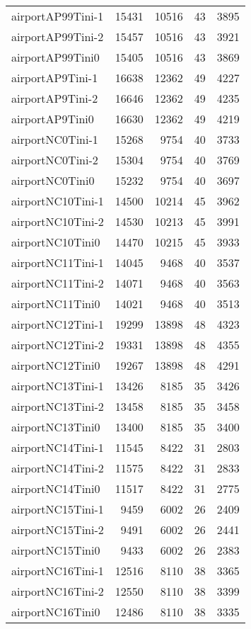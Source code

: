 \begin{tabular}{lrrrr}
airportAP99Tini-1 & 15431 & 10516 & 43 & 3895 \\
airportAP99Tini-2 & 15457 & 10516 & 43 & 3921 \\
airportAP99Tini0 & 15405 & 10516 & 43 & 3869 \\
airportAP9Tini-1 & 16638 & 12362 & 49 & 4227 \\
airportAP9Tini-2 & 16646 & 12362 & 49 & 4235 \\
airportAP9Tini0 & 16630 & 12362 & 49 & 4219 \\
airportNC0Tini-1 & 15268 & 9754 & 40 & 3733 \\
airportNC0Tini-2 & 15304 & 9754 & 40 & 3769 \\
airportNC0Tini0 & 15232 & 9754 & 40 & 3697 \\
airportNC10Tini-1 & 14500 & 10214 & 45 & 3962 \\
airportNC10Tini-2 & 14530 & 10213 & 45 & 3991 \\
airportNC10Tini0 & 14470 & 10215 & 45 & 3933 \\
airportNC11Tini-1 & 14045 & 9468 & 40 & 3537 \\
airportNC11Tini-2 & 14071 & 9468 & 40 & 3563 \\
airportNC11Tini0 & 14021 & 9468 & 40 & 3513 \\
airportNC12Tini-1 & 19299 & 13898 & 48 & 4323 \\
airportNC12Tini-2 & 19331 & 13898 & 48 & 4355 \\
airportNC12Tini0 & 19267 & 13898 & 48 & 4291 \\
airportNC13Tini-1 & 13426 & 8185 & 35 & 3426 \\
airportNC13Tini-2 & 13458 & 8185 & 35 & 3458 \\
airportNC13Tini0 & 13400 & 8185 & 35 & 3400 \\
airportNC14Tini-1 & 11545 & 8422 & 31 & 2803 \\
airportNC14Tini-2 & 11575 & 8422 & 31 & 2833 \\
airportNC14Tini0 & 11517 & 8422 & 31 & 2775 \\
airportNC15Tini-1 & 9459 & 6002 & 26 & 2409 \\
airportNC15Tini-2 & 9491 & 6002 & 26 & 2441 \\
airportNC15Tini0 & 9433 & 6002 & 26 & 2383 \\
airportNC16Tini-1 & 12516 & 8110 & 38 & 3365 \\
airportNC16Tini-2 & 12550 & 8110 & 38 & 3399 \\
airportNC16Tini0 & 12486 & 8110 & 38 & 3335 \\

\end{tabular}
